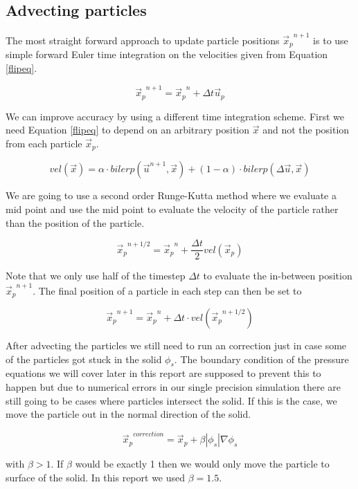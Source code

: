 \subsection{Advecting particles}

The most straight forward approach to update particle positions ${\vec{x}_p}^{n+1}$ is to use simple forward Euler time integration on the velocities given from Equation \ref{flipeq}. 

\begin{equation}
{\vec{x}_p}^{n+1} = {\vec{x}_p}^n + \Delta t \vec{u}_p 
\end{equation}

We can improve accuracy by using a different time integration scheme. First we need Equation \ref{flipeq} to depend on an arbitrary position $\vec{x}$ and not the position from each particle $\vec{x}_p$.

\begin{equation}
vel(\vec{x}) = \alpha \cdot bilerp(\vec{u}^{n+1}, \vec{x}) + (1-\alpha) \cdot bilerp(\Delta \vec{u},\vec{x})
\label{flipeq}
\end{equation}

We are going to use a second order Runge-Kutta method where we evaluate a mid point and use the mid point to evaluate the velocity of the particle rather than the position of the particle.

\begin{equation}
{\vec{x}_p}^{n + 1/2} = {\vec{x}_p}^n + \frac{\Delta t}{2} vel(\vec{x}_p)
\end{equation}

Note that we only use half of the timestep $\Delta t$ to evaluate the in-between position ${\vec{x}_p}^{n+1}$. The final position of a particle in each step can then be set to

\begin{equation}
{\vec{x}_p}^{n + 1} = {\vec{x}_p}^n + \Delta t \cdot vel({\vec{x}_p}^{n+1/2})
\end{equation}

After advecting the particles we still need to run an correction just in case some of the particles got stuck in the solid $\phi_s$. The boundary condition of the pressure equations we will cover later in this report are supposed to prevent this to happen but due to numerical errors in our single precision simulation there are still going to be cases where particles intersect the solid. If this is the case, we move the particle out in the normal direction of the solid.

\begin{equation}
{\vec{x}_p}^{correction} = \vec{x}_p + \beta |\phi_s|\nabla\phi_s
\end{equation}

with $\beta > 1$. If $\beta$ would be exactly 1 then we would only move the particle to surface of the solid. In this report we used $\beta = 1.5$.
